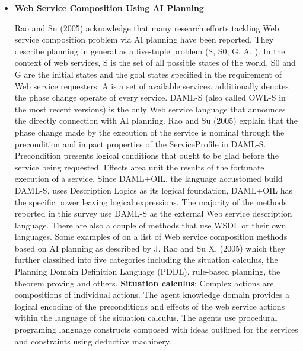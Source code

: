 \documentclass{article}
\begin{document}
\begin{itemize}
\item \textbf{Web Service Composition Using AI Planning}

Rao and Su (2005) acknowledge that many research efforts tackling Web service composition problem via AI planning have been reported. They describe planning in general as a five-tuple problem (S, S0, G, A, \textGamma). In the context of web services, S is the set of all possible states of the world, S0 and G are the initial states and the goal states specified in the requirement of Web service requesters. A is a set of available services. \textGamma \space additionally denotes the phase change operate of every service. DAML-S (also called OWL-S in the most recent versions) is the only Web service language that announces the directly connection with AI planning. Rao and Su (2005) explain that the phase change made by the execution of the service is nominal through the precondition and impact properties of the ServiceProfile in DAML-S. Precondition presents logical conditions that ought to be glad before the service being requested. Effects area unit the results of the fortunate execution of a service. Since DAML+OIL, the language accustomed build DAML-S, uses Description Logics as its logical foundation, DAML+OIL has the specific power leaving logical expressions. The majority of the methods reported in this survey use DAML-S as the external Web service description language. There are also a couple of methods that use WSDL or their own languages. Some examples of on a list of Web service composition methods based on AI planning as described by J. Rao and Su X. (2005) which they further classified into five categories including the situation calculus, the Planning Domain Definition Language (PDDL), rule-based planning, the theorem proving and others. \textbf{Situation calculus}: Complex actions are compositions of individual actions. The agent knowledge domain provides a logical encoding of the preconditions and effects of the web service actions within the language of the situation calculus. The agents use procedural programing language constructs composed with ideas outlined for the services and constraints using deductive machinery. 


\end{itemize}
\end{document}
